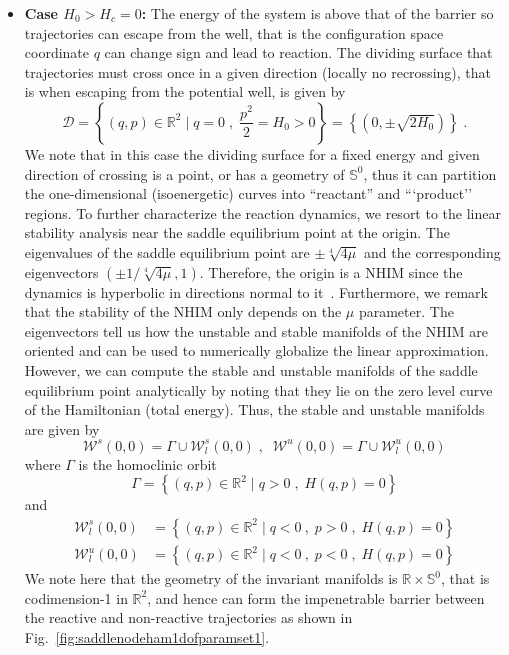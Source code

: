 \documentclass{ws-ijbc}
\begin{document}
\begin{itemize}
	\item \textbf{Case $H_0 > H_c = 0$:} The energy of the system is above that of the barrier so trajectories can escape from the well, that is the configuration space coordinate $q$ can change sign and lead to reaction. The dividing surface that trajectories must cross once in a given direction\cite{wiggins2016} (locally no recrossing), that is when escaping from the potential well, is given by 
	\begin{equation}
	\mathcal{D} = \left\lbrace (q, p) \in \mathbb{R}^2 \; | \; q = 0 \;,\; \frac{p^2}{2}  = H_0 > 0  \right\rbrace = \left\lbrace \left(0, \pm \sqrt{2H_0}\right) \right\rbrace \;. \label{eqn:snham_1dof_ds}
	\end{equation}
	We note that in this case the dividing surface for a fixed energy and given direction of crossing is a point, or has a geometry of $\mathbb{S}^0$, thus it can partition the one-dimensional (isoenergetic) curves into ``reactant'' and ```product'' regions. To further characterize the reaction dynamics, we resort to the linear stability analysis near the saddle equilibrium point at the origin. The eigenvalues of the saddle equilibrium point are $\pm \sqrt[4]{4\mu}$ and the corresponding eigenvectors $\left(\pm 1/ \sqrt[4]{4\mu},1\right)$. Therefore, the origin is a NHIM since the dynamics is hyperbolic in directions normal to it~\cite{wig2016}. Furthermore, we remark that the stability of the NHIM only depends on the $\mu$ parameter. The eigenvectors tell us how the unstable and stable manifolds of the NHIM are oriented and can be used to numerically globalize the linear approximation. However, we can compute the stable and unstable manifolds of the saddle equilibrium point analytically by noting that they lie on the zero level curve of the Hamiltonian (total energy). Thus, the stable and unstable manifolds are given by
	\begin{equation}
	\mathcal{W}^s(0,0) = \Gamma \cup \mathcal{W}^s_l(0,0) \;,\; \; \mathcal{W}^u(0,0) = \Gamma \cup \mathcal{W}^u_l(0,0)
	\end{equation}
	where $\Gamma$ is the homoclinic orbit
	\begin{equation}
	\Gamma = \left\lbrace  (q, p) \in \mathbb{R}^2 \; | \; q > 0 \;,\; H(q,p) = 0 \right\rbrace
	\end{equation}
	and
	\begin{equation}
	\begin{split}
	\mathcal{W}^s_l(0,0) &= \left\lbrace  (q, p) \in \mathbb{R}^2 \; | \; q < 0 \:,\; p > 0 \;,\; H(q,p) = 0 \right\rbrace \\
	\mathcal{W}^u_l(0,0) &= \left\lbrace  (q, p) \in \mathbb{R}^2 \; | \; q < 0 \:,\; p < 0 \;,\; H(q,p) = 0 \right\rbrace
	\end{split}
	\end{equation}
	We note here that the geometry of the invariant manifolds is $\mathbb{R} \times \mathbb{S}^0$, that is codimension-1 in $\mathbb{R}^2$, and hence can form the impenetrable barrier between the reactive and non-reactive trajectories as shown in Fig.~\ref{fig:saddlenodeham1dofparamset1}.
\end{itemize}
\end{document}
